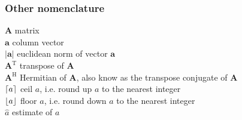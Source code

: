 \subsubsection*{Other nomenclature}


$\bm{A}$ \mytab matrix\\
$\bm{a}$ \mytab column vector\\
$|\bm{a}|$ \mytab euclidean norm of vector $\bm{a}$\\
$\bm{A}^\text{T}$ \mytab transpose of $\bm{A}$\\
$\bm{A}^\text{H}$ \mytab Hermitian of $\bm{A}$, also know as the transpose conjugate of $\bm{A}$\\
$\lceil a\rceil$ \mytab ceil $a$, i.e. round up $a$ to the nearest integer\\
$\lfloor a\rfloor$ \mytab floor $a$, i.e. round down $a$ to the nearest integer \\
$\hat{a}$ \mytab estimate of $a$\\

\clearpage
\thispagestyle{empty}


\cleardoublepage
 \setcounter{page}{1}
\baselineskip 18pt